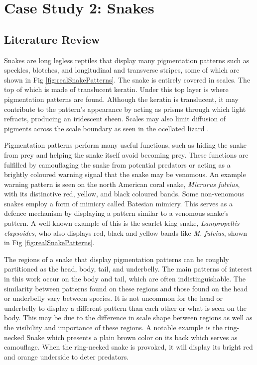 % 

\chapter{Case Study 2: Snakes}
\section{Literature Review}
Snakes are long legless reptiles that display many pigmentation patterns such as speckles, blotches, and longitudinal and transverse stripes, some of which are shown in Fig \ref{fig:realSnakePatterns}. The snake is entirely covered in scales. The top of which is made of translucent keratin. Under this top layer is where pigmentation patterns are found. Although the keratin is translucent, it may contribute to the pattern's appearance by acting as prisms through which light refracts, producing an iridescent sheen. Scales may also limit diffusion of pigments across the scale boundary as seen in the ocellated lizard \citep{manukyan2017}.

Pigmentation patterns perform many useful functions, such as hiding the snake from prey and helping the snake itself avoid becoming prey. These functions are fulfilled by camouflaging the snake from potential predators or acting as a brightly coloured warning signal that the snake may be venomous. An example warning pattern is seen on the north American coral snake, \textit{Micrurus fulvius}, with its distinctive red, yellow, and black coloured bands. Some non-venomous snakes employ a form of mimicry called Batesian mimicry. This serves as a defence mechanism by displaying a pattern similar to a venomous snake's pattern. A well-known example of this is the scarlet king snake, \textit{Lampropeltis elapsoides}, who also displays red, black and yellow bands like \textit{M. fulvius}, shown in Fig \ref{fig:realSnakePatterns}.

The regions of a snake that display pigmentation patterns can be roughly partitioned as the head, body, tail, and underbelly. The main patterns of interest in this work occur on the body and tail, which are often indistinguishable. The similarity between patterns found on these regions and those found on the head or underbelly vary between species. It is not uncommon for the head or underbelly to display a different pattern than each other or what is seen on the body. This may be due to the difference in scale shape between regions as well as the visibility and importance of these regions. A notable example is the ring-necked Snake which presents a plain brown color on its back which serves as camouflage. When the ring-necked snake is provoked, it will display its bright red and orange underside to deter predators.

